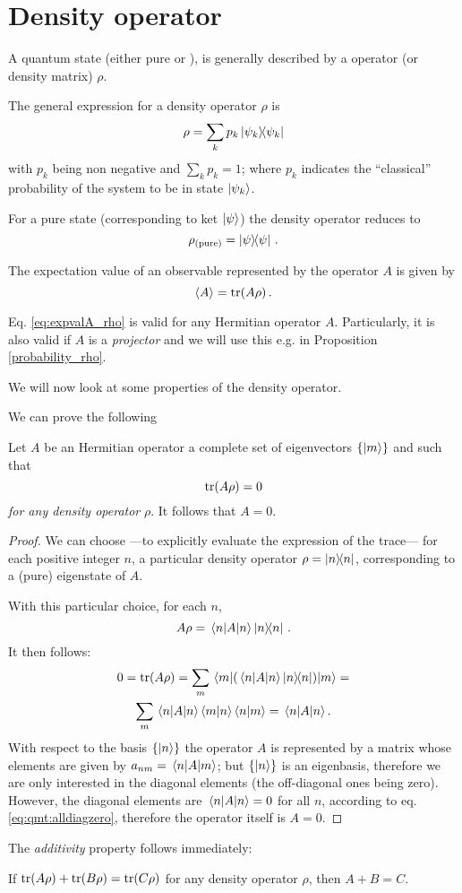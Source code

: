 \section{Density operator}\label{app:density}

A quantum state (either pure or ),
is generally described by a  operator (or density matrix) $\rho$.

The general expression for a density operator $\rho$ is
$$
  \rho = \sum_{k}p_{k}\ketbra{\psi_{k}}
$$
with $p_{k}$ being non negative and $\sum_{k}p_{k} = 1$;
where $p_k$ indicates the ``classical'' probability of the system to be in state $\ket{\psi_{k}}$.

For a pure state (corresponding to ket $\ket{\psi}$) the density operator reduces to
\[
  \rho_{(\text{pure})} = \ketbra{\psi}\,\text{.}
\]

The expectation value of an observable represented by the operator $A$
is given by \parencite{BlumDensity, FanoDensity}
\begin{equation}\label{eq:expvalA_rho}
  \expval{A} = \tr(A\rho)\,.
\end{equation}

Eq. \eqref{eq:expvalA_rho} is valid for any Hermitian operator $A$. Particularly,
it is also valid if $A$ is a \emph{projector} and we will use this
e.g. in Proposition \ref{probability_rho}.

We will now look at some properties of the density operator.

We can prove the following
\begin{proposition}
  Let $A$ be an Hermitian operator
  a complete set of eigenvectors $\{\ket{m}\}$
  and
  such that
  $$
    \tr(A\rho) = 0 
  $$
  \emph{for any density operator} $\rho$.
  It follows that $A = 0$.

  \begin{proof}
    We can choose
    ---to explicitly evaluate the expression of the trace---
    for each positive integer $n$,
    a particular density operator $\rho = \ketbra{n}$,
    corresponding to a (pure) eigenstate of $A$.

    With this particular choice,
    for each $n$,
    $$
      A\rho = \mel{n}{A}{n}\ketbra{n}\,.
    $$
    It then follows:
    \begin{multline}\label{eq:qmt:alldiagzero}
      0 = \tr(A\rho) = \sum_{m}\mel{m}{ ( \mel{n}{A}{n}\ketbra{n} ) }{m} = \\
          \sum_{m} \mel{n}{A}{n} \braket{m}{n} \braket{n}{m}
        = \mel{n}{A}{n} .
    \end{multline}
    With respect to the basis $\left\{\ket{n}\right\}$ the operator $A$ is
    represented by a matrix whose elements are given by $a_{nm} = \mel{n}{A}{m}$;
    but $\left\{\ket{n}\right\}$ is an eigenbasis, therefore we are only interested in the diagonal
    elements (the off-diagonal ones being zero).
    However, the diagonal elements are  $\mel{n}{A}{n} = 0$
    for all $n$, according to eq. \eqref{eq:qmt:alldiagzero}, therefore the operator itself is $A=0$.
  \end{proof}
\end{proposition}

The \emph{additivity} property follows immediately:

\begin{corollary}
If $\tr(A\rho) + \tr(B\rho) = \tr(C\rho)$ for any density operator $\rho$,
then $A + B = C$.
\end{corollary}
